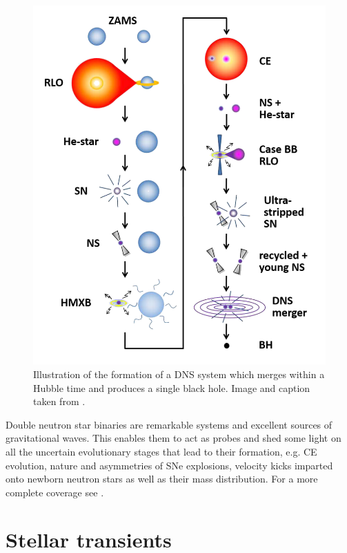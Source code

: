 \documentclass[../../main/thesis_msc.tex]{subfiles}
\begin{document}
				\begin{figure}[h]
					\centering
					\includegraphics[scale = 0.85]{../figures/chapter1/DNS_formation_transparent.png}
					\caption{Illustration of the formation of a DNS system which merges within a Hubble time and produces a single black hole. Image and caption taken from \cite{Tauris2017}.}
					\label{fig:DNS}
				\end{figure}
				
				Double neutron star binaries are remarkable systems and excellent sources of gravitational waves. This enables them to act as probes and shed some light on all the uncertain evolutionary stages that lead to their formation, e.g. CE evolution, nature and asymmetries of SNe explosions, velocity kicks imparted onto newborn neutron stars as well as their mass distribution. For a more complete coverage see \cite[][and references therein]{Tauris2017, Ivanova_DNS, Dewi_DNS}.
				
	\section{Stellar transients}
	
\end{document}
